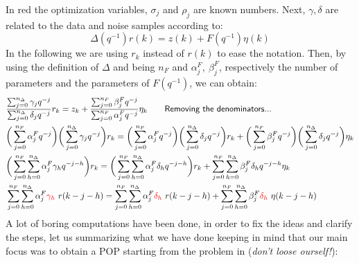 \noindent
In {\color{red}red} the optimization variables, $\sigma_j$ and $\rho_j$ are known numbers. Next, $\gamma,\delta$ are related to the data and noise samples according to: $$\Delta(q^{-1}) r(k)=z(k) + F(q^{-1}) \eta(k)$$
In the following we are using  $r_k$ instead of $r(k)$ to ease the notation. Then, by using the definition of $\Delta$ and being $n_F$ and $\alpha_j^F, \ \beta_j^F$, respectively the number of parameters and the parameters of $F(q^{-1})$, we can obtain:
\begin{align}
    &\frac{
        \sum_{j=0}^{n_\Delta} \gamma_j q^{-j}
    }{
        \sum_{j=0}^{n_\Delta} \delta_j q^{-j}
    }r_k = z_k +  \frac{
        \sum_{j=0}^{n_F} \beta_j^F q^{-j}
    }{
        \sum_{j=0}^{n_F} \alpha_j^F q^{-j}
    } \eta_k \qquad \textsf{Removing the denominators...}\label{eq:first_1}\\
    &
    \bigg(\sum_{j=0}^{n_F} \alpha_j^F q^{-j}\bigg) 
    \bigg(\sum_{j=0}^{n_\Delta} \gamma_j q^{-j}\bigg) r_k=
    \bigg(\sum_{j=0}^{n_F} \alpha_j^F q^{-j}\bigg) 
    \bigg(\sum_{j=0}^{n_\Delta} \delta_j q^{-j}\bigg) r_k + 
    \bigg(\sum_{j=0}^{n_F} \beta_j^F q^{-j}\bigg) \bigg(\sum_{j=0}^{n_\Delta} \delta_j q^{-j}\bigg) \eta_k \label{eq:plain_eq} \\
    &\bigg(
        \sum_{j=0}^{n_F} \sum_{h=0}^{n_\Delta} {\alpha_j^F \gamma_h q^{-j-h}}
    \bigg) r_k =
    \bigg(
        \sum_{j=0}^{n_F} \sum_{h=0}^{n_\Delta}{\alpha_j^F \delta_h q^{-j-h}} 
        \bigg) 
    r_k+
        \sum_{j=0}^{n_F} \sum_{h=0}^{n_\Delta}{\beta_j^F \delta_h q^{-j-h}}
     \eta_k\label{eq:lastbutone}\\
     &
        \sum_{j=0}^{n_F} \sum_{h=0}^{n_\Delta} {\alpha_j^F {\color{red}\gamma_h} \ r({k-j-h})} =
        \sum_{j=0}^{n_F} \sum_{h=0}^{n_\Delta}{\alpha_j^F {\color{red}\delta_h} \ r({k-j-h})} +
        \sum_{j=0}^{n_F} \sum_{h=0}^{n_\Delta}{\beta_j^F {\color{red}\delta_h} \ \eta({k-j-h})}\label{eq:last_one}
\end{align}
A lot of boring computations have been done, in order to fix the ideas and clarify the steps, let us summarizing what we have done keeping in mind that our main focus was to obtain a POP starting from the problem in  (\textit{don't loose ourself!}):
